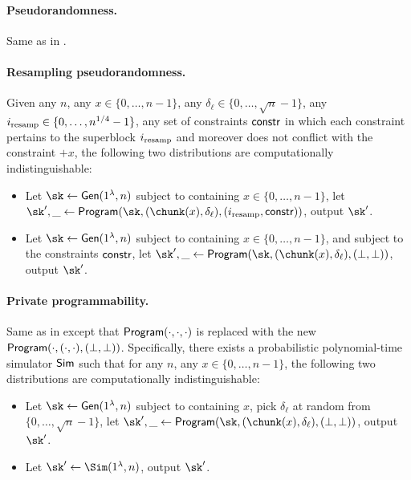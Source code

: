\paragraph{\bf Pseudorandomness.}
Same as in .

\paragraph{\bf Resampling pseudorandomness.}
Given any $n$, any $x \in \{0, \ldots, n-1\}$, 
any $\delta_\ell \in \{0, \ldots, \sqrt{n}-1\}$,
any $i_{\rm resamp} \in \{0, \ldots, n^{1/4}-1\}$, 
any set of constraints ${\sf constr}$ in which each constraint
pertains to the superblock $i_{\rm resamp}$ 
and moreover does not conflict with the constraint $+x$,  
the following two distributions are computationally indistinguishable:
\begin{itemize}[leftmargin=5mm]
\item 
Let $\sk \leftarrow {\sf Gen}(1^\lambda, n)$ 
subject to containing $x \in \{0, \ldots, n-1\}$, 
let $\sk', \_ \leftarrow {\sf Program}(\sk, (\chunk(x), \delta_\ell), 
(i_{\rm resamp}, {\sf constr}))$, 
output $\sk'$.
\item 
Let $\sk \leftarrow {\sf Gen}(1^\lambda, n)$ 
subject to containing $x \in \{0, \ldots, n-1\}$, 
and subject to the constraints ${\sf constr}$, 
let $\sk', \_ \leftarrow {\sf Program}(\sk, (\chunk(x), \delta_\ell), 
(\bot, \bot))$, 
output $\sk'$.
\end{itemize}

\paragraph{\bf Private programmability.}
Same as in  except
that ${\sf Program}(\cdot, \cdot, \cdot)$
is replaced with the new 
${\sf Program}(\cdot, (\cdot, \cdot), (\bot, \bot))$.
Specifically, there exists a probabilistic polynomial-time simulator ${\sf Sim}$
such that
for any $n$, any $x \in \{0, \ldots, n-1\}$, 
the following two distributions are computationally indistinguishable:
\begin{itemize}[leftmargin=5mm]
\item 
Let $\sk \leftarrow {\sf Gen}(1^\lambda, n)$ 
subject to containing $x$, 
pick $\delta_\ell$ at random from $\{0, \ldots, \sqrt{n}-1\}$, 
let $\sk', \_ \leftarrow {\sf Program}(\sk, (\chunk(x), \delta_\ell), 
(\bot, \bot))$, 
output $\sk'$.
\item  
Let $\sk' \leftarrow \Sim(1^\lambda, n)$, output $\sk'$.
\end{itemize}

